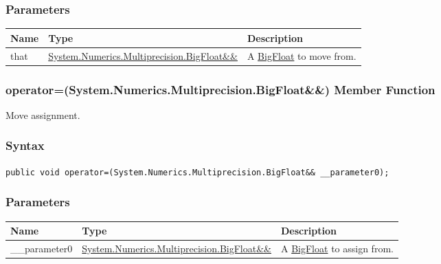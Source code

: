 \documentclass[a4paper,oneside,11.000000pt]{book}
\begin{document}
\subsubsection*{Parameters}
\begin{flushleft}
\begin{supertabular}[l]{!{\raggedright}p{1.30721cm}!{\raggedright}p{8.55945cm}!{\raggedright}p{4.93333cm}}
\textbf{Name}
& \textbf{Type}
& \textbf{Description}
\\
\hline
that
& \hyperlink{System.Numerics.Multiprecision.BigFloat}{System.\-Numerics.\-Multiprecision.\-BigFloat\&\-\&\-}
& A \hyperlink{System.Numerics.Multiprecision.BigFloat}{BigFloat} to move from.

\\
\end{supertabular}

\end{flushleft}
\clearpage

\hypertarget{System.Numerics.Multiprecision.BigFloat.operator.assign.P.System.Numerics.Multiprecision.BigFloat.RR.System.Numerics.Multiprecision.BigFloat}{\subsubsection*{operator=(System.Numerics.Multiprecision.BigFloat\&\&) Member Function}}\begin{flushleft}
Move assignment.

\end{flushleft}
\subsubsection*{Syntax}
\texttt{public void operator=(System.Numerics.Multiprecision.BigFloat\&\& \_\_parameter0);}
\subsubsection*{Parameters}
\begin{flushleft}
\begin{supertabular}[l]{!{\raggedright}p{2.61335cm}!{\raggedright}p{7.25332cm}!{\raggedright}p{4.93333cm}}
\textbf{Name}
& \textbf{Type}
& \textbf{Description}
\\
\hline
\_\_parameter0
& \hyperlink{System.Numerics.Multiprecision.BigFloat}{System.\-Numerics.\-Multiprecision.\-BigFloat\&\-\&\-}
& A \hyperlink{System.Numerics.Multiprecision.BigFloat}{BigFloat} to assign from.

\\
\end{supertabular}

\end{flushleft}
\clearpage
\end{document}
